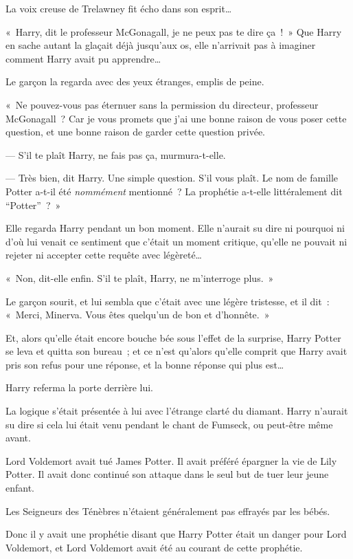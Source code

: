 La voix creuse de Trelawney fit écho dans son esprit…

«~Harry, dit le professeur McGonagall, je ne peux pas te dire ça~!~» Que Harry en sache autant la glaçait déjà jusqu'aux os, elle n'arrivait pas à imaginer comment Harry avait pu apprendre…

Le garçon la regarda avec des yeux étranges, emplis de peine.

«~Ne pouvez-vous pas éternuer sans la permission du directeur, professeur McGonagall~? Car je vous promets que j'ai une bonne raison de vous poser cette question, et une bonne raison de garder cette question privée.

--- S'il te plaît Harry, ne fais pas ça, murmura-t-elle.

--- Très bien, dit Harry. Une simple question. S'il vous plaît. Le nom de famille Potter a-t-il été \emph{nommément} mentionné~? La prophétie a-t-elle littéralement dit “Potter”~?~»

Elle regarda Harry pendant un bon moment. Elle n'aurait su dire ni pourquoi ni d'où lui venait ce sentiment que c'était un moment critique, qu'elle ne pouvait ni rejeter ni accepter cette requête avec légèreté…

«~Non, dit-elle enfin. S'il te plaît, Harry, ne m'interroge plus.~»

Le garçon sourit, et lui sembla que c'était avec une légère tristesse, et il dit~: «~Merci, Minerva. Vous êtes quelqu'un de bon et d'honnête.~»

Et, alors qu'elle était encore bouche bée sous l'effet de la surprise, Harry Potter se leva et quitta son bureau~; et ce n'est qu'alors qu'elle comprit que Harry avait pris son refus pour une réponse, et la bonne réponse qui plus est…

Harry referma la porte derrière lui.

La logique s'était présentée à lui avec l'étrange clarté du diamant. Harry n'aurait su dire si cela lui était venu pendant le chant de Fumseck, ou peut-être même avant.

Lord Voldemort avait tué James Potter. Il avait préféré épargner la vie de Lily Potter. Il avait donc continué son attaque dans le seul but de tuer leur jeune enfant.

Les Seigneurs des Ténèbres n'étaient généralement pas effrayés par les bébés.

Donc il y avait une prophétie disant que Harry Potter était un danger pour Lord Voldemort, et Lord Voldemort avait été au courant de cette prophétie.

